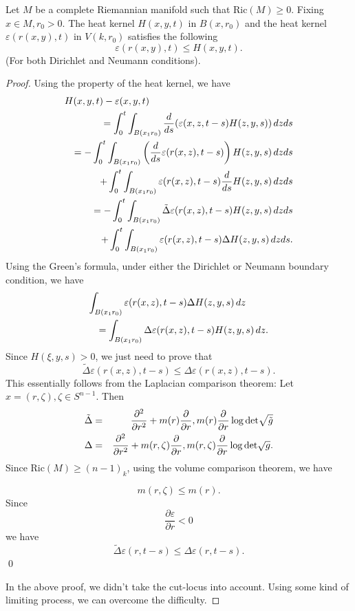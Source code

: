 \begin{theorem} Let $M$ be a complete Riemannian manifold such that  Ric$(M) \geq 0$. Fixing $ x \in M , r_0 > 0 $. The heat kernel $ H (x, y, t) $ in $ B(x, r_0) $ and the heat kernel $ \varepsilon (r (x, y) , t) $ in $ V (k, r_0) $ satisfies the following
%
\[ \varepsilon (r (x, y) , t) \leq H (x, y, t). \]
%
(For both Dirichlet and Neumann conditions).
\end{theorem}
\begin{proof} Using the property of the heat kernel, we have 
%
\begin{eqnarray*}
\lefteqn{H(x, y, t) - \varepsilon (x, y, t)} \\
&&= \int ^t _0 \int _{B (x_1 r_0)} \frac{d}{ds}  ( \varepsilon (x, z, t - s) H (z, y, s) ) \, d z ds\\
&&= - \int ^t _0 \int _{B (x_1 r_0) }\left( \frac{d}{ds}\varepsilon (r (x, z), t-s)\right) H(z, y, s)  \, d z ds\\
&&+ \int^t_0 \int _{B (x_1 r_0) }\varepsilon (r (x, z), t-s)\frac{d}{ds} H(z, y, s)  \, d z ds \\
&&= - \int^t_0 \int _{B (x_1 r_0)} \tilde{\Delta} \varepsilon (r (x, z), t - s) H(z, y, s)  \, d z ds\\
&&+ \int^t_0 \int _{B (x_1 r_0)}\varepsilon (r (x, z), t - s) \Delta H(z, y, s)  \, d z ds.
\end{eqnarray*}
Using the Green's formula, under either the Dirichlet or Neumann boundary condition, we have 
%
\begin{eqnarray*}
\lefteqn{\int _{B (x_1 r_0)}\varepsilon (r (x, z), t - s) \Delta H(z, y, s)  \, d z}\\
&&= \int _{B (x_1 r_0)}\Delta \varepsilon (r (x, z), t - s)  H(z, y, s)  \, d z.
\end{eqnarray*}
%
Since $ H(\xi, y, s)  > 0 $, we just need to prove that
%
\[ \tilde{\Delta} \varepsilon (r (x, z), t - s)\leq \Delta  \varepsilon (r (x, z), t - s).\]
%
This essentially follows from the Laplacian comparison theorem: Let $ x = (r, \zeta ) , \zeta \in S^{n-1} $. Then 
%
\begin{eqnarray*}
\tilde{\Delta } & = & \frac{\partial ^2}{\partial r^2} + m (r) \frac{\partial }{\partial r} , m (r) \frac{\partial }{\partial r} \log {\rm det} \sqrt{\tilde{g}}\\
\Delta & = & \frac{\partial ^2}{\partial r^2} + m (r,\zeta) \frac{\partial }{\partial r} , m (r,\zeta) \frac{\partial }{\partial r} \log {\rm det} \sqrt{{g}}.
\end{eqnarray*}
%
Since Ric$(M) \geq (n-1)_k$, using the volume comparison theorem, we have 

\[ m (r, \zeta ) \leq m (r). \]
%
Since 
\[ \frac{\partial \varepsilon}{\partial r} < 0 \]
%
we have 
%
\[ \tilde{\Delta} \varepsilon (r, t-s) \leq \Delta \varepsilon (r, t - s). \]
\qed

In the above proof, we didn't take the cut-locus into account. Using some kind of limiting process, we can overcome the difficulty.
\end{proof}

